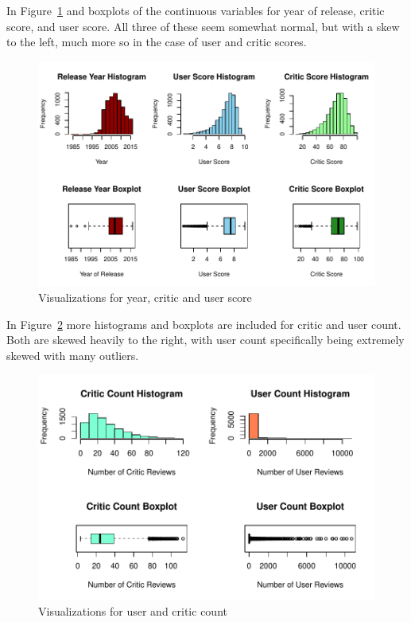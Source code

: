 \documentclass[12pt]{article}
\begin{document}
In Figure~\ref{fig:histandboxpt1} and boxplots of the continuous variables for year of release, critic score, and user score.
All three of these seem somewhat normal, but with a skew to the left, much more so in the case of user and critic scores.
\begin{figure}[tbp]
  \centering
  \includegraphics[width=\textwidth]{histandboxpt1.pdf}
  \caption{Visualizations for year, critic and user score}
  \label{fig:histandboxpt1}
\end{figure}

In Figure~\ref{fig:histandboxpt2} more histograms and boxplots are included for critic and user count.
Both are skewed heavily to the right, with user count specifically being extremely skewed with many outliers.
\begin{figure}[tbp]
  \centering
  \includegraphics[width=\textwidth]{histandboxpt2.pdf}
  \caption{Visualizations for user and critic count}
  \label{fig:histandboxpt2}
\end{figure}
\end{document}
